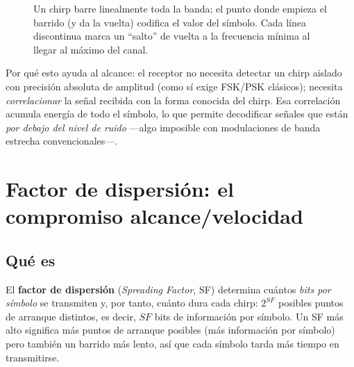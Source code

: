 \begin{figure}[h]
  \centering
  \caption{Un chirp barre linealmente toda la banda; el punto donde empieza el barrido
    (y da la vuelta) codifica el valor del símbolo. Cada línea discontinua marca un
    ``salto'' de vuelta a la frecuencia mínima al llegar al máximo del canal.}
\end{figure}

Por qué esto ayuda al alcance: el receptor no necesita detectar un chirp aislado con precisión
absoluta de amplitud (como sí exige FSK/PSK clásicos); necesita \emph{correlacionar} la señal
recibida con la forma conocida del chirp. Esa correlación acumula energía de todo el símbolo, lo
que permite decodificar señales que están \emph{por debajo del nivel de ruido} —algo imposible
con modulaciones de banda estrecha convencionales—.

\section{Factor de dispersión: el compromiso alcance/velocidad}

\subsection*{Qué es}

El \textbf{factor de dispersión} (\emph{Spreading Factor}, SF) determina cuántos \emph{bits por
símbolo} se transmiten y, por tanto, cuánto dura cada chirp: $2^{SF}$ posibles puntos de
arranque distintos, es decir, $SF$ bits de información por símbolo. Un SF más alto significa
más puntos de arranque posibles (más información por símbolo) pero también un barrido más
lento, así que cada símbolo tarda más tiempo en transmitirse.

